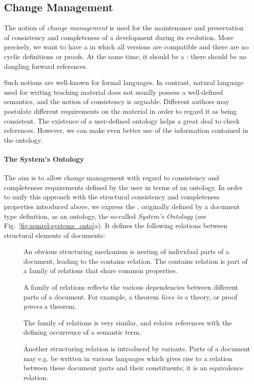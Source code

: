 \subsection{Change Management}

The notion of \emph{change management} is used for the maintenance and preservation of
consistency and completeness of a development during its evolution.  More precisely, we
want to have a {} in which all versions are compatible
and there are no cyclic definitions or proofs.  At the same time, it should be a
{}: there should be no dangling forward references.

Such notions are well-known for formal languages. In contrast, natural language used for
writing teaching material does not usually possess a well-defined semantics, and the
notion of consistency is arguable.  Different authors may postulate different requirements
on the material in order to regard it as being consistent.  The existence of a
user-defined ontology helps a great deal to check references. However, we can make even
better use of the information contained in the ontology.

\paragraph{The System's Ontology}

The aim is to allow change management with regard to consistency and completeness
requirements defined by the user in terms of an ontology. In order to unify this approach
with the structural consistency and completeness properties introduced above, we express
the {}, originally defined by a document type definition, as
an ontology, the so-called \emph{System's Ontology} (see
Fig.~\ref{fig:semrel-systems_onto}a).  It defines the following relations between
structural elements of documents:
\begin{description}
\item [{}] An obvious structuring mechanism is nesting of individual
  parts of a document, leading to the contains relation. The contains relation is part of
  a family of {} relations that share common properties.
\item [{}] A family of {} relations reflects the
  various dependencies between different parts of a document.  For example, a theorem
  \emph{lives in} a theory, or proof \emph{proves} a theorem.
\item [{}] The family of {} relations is very similar,
  and relates references with the defining occurrence of a semantic term.
\item [{}] Another structuring relation is introduced by
  variants. Parts of a document may e.g. be written in various languages which gives rise
  to a {} relation between these document parts and their constituents;
  it is an equivalence relation.
\end{description}

